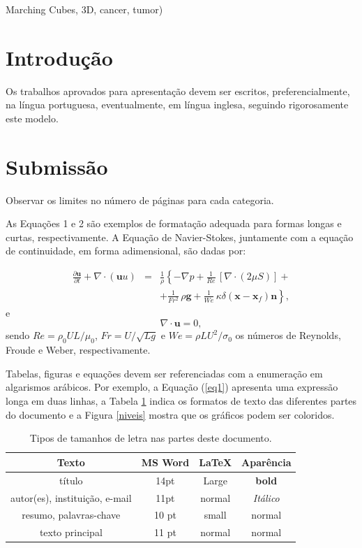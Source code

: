 \documentclass[a4paper,11pt]{article}
\begin{document}
{{\vskip 0.2cm  %


{\small{ %
 Marching Cubes, 3D, cancer, tumor)
}}
}


\section*{Introdução}

Os trabalhos aprovados para apresentação devem ser escritos, preferencialmente, na língua portuguesa, eventualmente, em língua inglesa, seguindo rigorosamente este modelo.


\section*{Submissão}

Observar os limites no número de páginas para cada categoria.

As Equações 1 e 2 são exemplos de formatação adequada para formas longas e curtas, respectivamente. A Equação de Navier-Stokes, juntamente com a equação de continuidade, em forma adimensional, são dadas por:

\begin{eqnarray}
\nonumber
\frac{\partial {\mathbf u}}{\partial t} + \nabla \cdot ({\mathbf uu}) &=& \frac{1}{\rho}\left\{-\nabla p + \frac{1}{Re}\,[\nabla \cdot (2 \mu S)] +\right.
\\
&& \left.+\frac{1}{Fr^2}\,\rho {\mathbf g} +
\frac{1}{We}\,\kappa \delta ({\mathbf x} - {\mathbf x}_f) {\mathbf n}\right\},
\label{eq1}
\end{eqnarray}
e
\begin{equation}
\nabla \cdot {\mathbf u} = 0,
\label{eq2}
\end{equation}
\normalsize
sendo $Re = \rho_{0}UL/ \mu_{0}$, $Fr = U/ \sqrt{Lg}$ e $We = \rho L U^2 /\sigma_{0}$ os números de Reynolds, Froude e Weber, respectivamente.

Tabelas, figuras e equações devem ser referenciadas com a enumeração em algarismos arábicos. Por exemplo, a Equação (\ref{eq1}) apresenta uma expressão longa em duas linhas, a Tabela \ref{fonts} indica os formatos de texto das diferentes partes do documento e a Figura \ref{niveis} mostra que os gráficos podem ser coloridos.


\begin{table}[h]
\caption{{\small Tipos de tamanhos de letra nas partes deste documento.}}\label{fonts}
\centering
\begin{tabular}{|c|c|c|c|}
\hline
{\bf Texto} & {\bf MS Word} & {\bf LaTeX} & {\bf Aparência} \\
\hline
título & 14pt & Large & \textbf{bold}\\
autor(es), instituição, e-mail & 11pt & normal & \textit{Itálico}\\
resumo, palavras-chave  &	10 pt	 & small  &	{\small normal}\\
texto principal	 &11 pt & normal & normal\\
\hline
\end{tabular}
\end{table}

}
\end{document}
